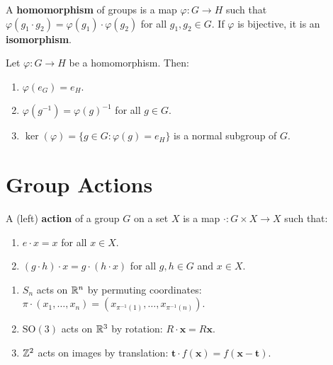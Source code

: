 \begin{definition}
A \textbf{homomorphism} of groups is a map $\varphi: G \to H$ such that
$\varphi(g_1 \cdot g_2) = \varphi(g_1) \cdot \varphi(g_2)$ for all
$g_1, g_2 \in G$. If $\varphi$ is bijective, it is an \textbf{isomorphism}.
\end{definition}

\begin{proposition}
Let $\varphi: G \to H$ be a homomorphism. Then:
\begin{enumerate}
    \item $\varphi(e_G) = e_H$.
    \item $\varphi(g^{-1}) = \varphi(g)^{-1}$ for all $g \in G$.
    \item $\ker(\varphi) = \{g \in G : \varphi(g) = e_H\}$ is a normal subgroup of $G$.
\end{enumerate}
\end{proposition}

\section{Group Actions}

\begin{definition}
A (left) \textbf{action} of a group $G$ on a set $X$ is a map
$\cdot: G \times X \to X$ such that:
\begin{enumerate}
    \item $e \cdot x = x$ for all $x \in X$.
    \item $(g \cdot h) \cdot x = g \cdot (h \cdot x)$ for all $g, h \in G$ and $x \in X$.
\end{enumerate}
\end{definition}

\begin{example}
\begin{enumerate}
    \item $S_n$ acts on $\mathbb{R}^n$ by permuting coordinates:
          $\pi \cdot (x_1, \ldots, x_n) = (x_{\pi^{-1}(1)}, \ldots, x_{\pi^{-1}(n)})$.
    \item $\mathrm{SO}(3)$ acts on $\mathbb{R}^3$ by rotation: $R \cdot \mathbf{x} = R\mathbf{x}$.
    \item $\mathbb{Z}^2$ acts on images by translation: $\mathbf{t} \cdot f(\mathbf{x}) = f(\mathbf{x} - \mathbf{t})$.
\end{enumerate}
\end{example}

